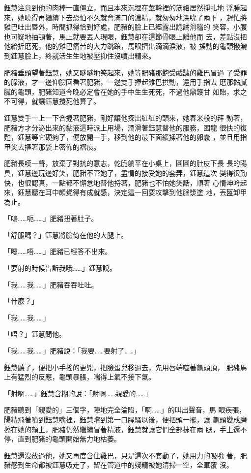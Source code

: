 鈺慧注意到他的肉棒一直僵立，而且本來沉埋在莖幹裡的筋絡居然掙扎地
浮腫起來，她曉得再繼續下去恐怕不久就會滿口的濃精，就匆匆地深吮了兩下
，趕忙將雞巴吐出唇外，時間抓得恰到好處，肥豬的臉上已經露出詭譎滑稽的
笑容，小腹也可疑地抽頓著，馬上就要丟人現眼，鈺慧卻在這節骨眼上離他而
去，差點沒把他給折磨死，他的雞巴痛苦的大力跳踉，馬眼擠出滴滴淚液，被
搖動的龜頭撥灑到鈺慧臉上，終就活生生地被壓抑住沒噴出精來。

肥豬垂頭望著鈺慧，她又瞇瞇地笑起來，她等肥豬那飽受戲謔的雞巴冒過
了受罪的腺液，才一邊仰臉回看著肥豬，一邊雙手捧起雞巴拱動，還用手指去
磨那黏膩膩的龜頭，肥豬知道今晚必定會在她的手中生生死死，不過他鼎鑊甘
如貽，求之不可得，就讓鈺慧攪死他算了。

鈺慧雙手一上一下合握著肥豬，剛好讓他探出紅紅的頭來，她舂米般的拜
動著，肥豬方才分泌出來的黏液這時派上用場，潤滑著鈺慧替他的服務，困龍
很快的復甦，鈺慧等它硬夠了，便放開一手，移到他的最下面緩揉著他的卵囊
，並且用指甲尖去摳著那袋上密佈的褶痕。

肥豬長嘆一聲，放棄了對抗的意志，乾脆躺平在小桌上，圓圓的肚皮下長
長的陽具，鈺慧邊玩邊好笑，肥豬不管她了，盡情的接受她的套弄，鈺慧這次
變得很勤快，也很認真，一點都不懈怠地替他捋著，肥豬也不怕她笑話，順著
心情呻吟起來，鈺慧聽在耳中頗覺得有成就感，決定這一回要攻擊到他腦漿塗
地，丟盔卸甲為止。

「嗚……呃……」肥豬扭著肚子。

「舒服嗎？」鈺慧將臉倚在他的大腿上。

「嗯……唔……」肥豬已經答不出來。

「要射的時候告訴我哦……」鈺慧說。

「我……我……」肥豬吞吞吐吐。

「什麼？」

「我……我……」

「唔？」鈺慧問他。

「我……我……」肥豬說：「我要……要射了……」

鈺慧聽了，便把小手搖的更兇，把臉蛋兒移過去，先用唇端噬著龜頭頂，
肥豬馬上有猛烈的反應，龜頭暴脹，喘得上氣不接下氣。

「射啊……」鈺慧含糊的說：「射啊……親愛的……」

肥豬聽到「親愛的」三個字，陣地完全淪陷，「啊……」的叫出聲音，馬
眼疾張，陽精飛著噴到鈺慧嘴裡，鈺慧嚐到第一口腥騷以後，便把頭一擺，讓
龜頭變成磨擦在她的頰上，肥豬仍然繼續冒著精液，鈺慧就讓它們全部抹在兩
腮，手上還不停，直到肥豬的龜頭開始無力地枯萎。

鈺慧還沒放過他，她又再度含住雞巴，只是這次不套動了，她用力的吸吮
著，肥豬感到生命都被鈺慧吸走了，留在管道中的殘精被她清掃一空，全軍覆
沒。

